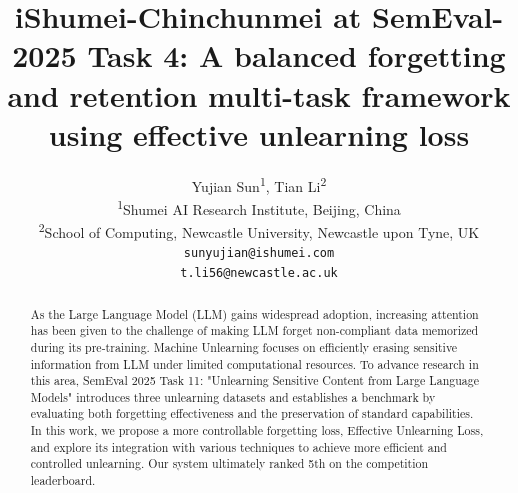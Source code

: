 \documentclass[11pt]{article}
\title{iShumei-Chinchunmei at SemEval-2025 Task 4: A balanced forgetting and retention multi-task framework using effective unlearning loss}
\author{
  Yujian Sun\textsuperscript{1},
  Tian Li\textsuperscript{2}
\\
  \textsuperscript{1}Shumei AI Research Institute, Beijing, China\\
  \textsuperscript{2}School of Computing, Newcastle University, Newcastle upon Tyne, UK
\\
  \texttt{sunyujian@ishumei.com}\\
  \texttt{t.li56@newcastle.ac.uk}
}
\begin{document}
\maketitle
\begin{abstract}




As the Large Language Model (LLM) gains widespread adoption, increasing attention has been given to the challenge of making LLM forget non-compliant data memorized during its pre-training. Machine Unlearning focuses on efficiently erasing sensitive information from LLM under limited computational resources. To advance research in this area, SemEval 2025 Task 11: "Unlearning Sensitive Content from Large Language Models" introduces three unlearning datasets and establishes a benchmark by evaluating both forgetting effectiveness and the preservation of standard capabilities. In this work, we propose a more controllable forgetting loss, Effective Unlearning Loss, and explore its integration with various techniques to achieve more efficient and controlled unlearning. Our system ultimately ranked 5th on the competition leaderboard.

\end{abstract}
\end{document}
